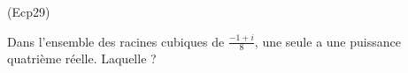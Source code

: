 \begin{tiny}(Ecp29)\end{tiny}
Dans l'ensemble des racines cubiques de $\frac{-1+i}{8}$, une seule a une puissance quatrième réelle. Laquelle ?